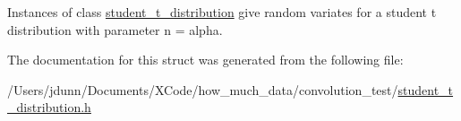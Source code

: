 Instances of class \mbox{\hyperlink{structstudent__t__distribution}{student\+\_\+t\+\_\+distribution}} give random variates for a student t distribution with parameter n = alpha. 

The documentation for this struct was generated from the following file\+:\begin{DoxyCompactItemize}
\item 
/\+Users/jdunn/\+Documents/\+X\+Code/how\+\_\+much\+\_\+data/convolution\+\_\+test/\mbox{\hyperlink{student__t__distribution_8h}{student\+\_\+t\+\_\+distribution.\+h}}\end{DoxyCompactItemize}
